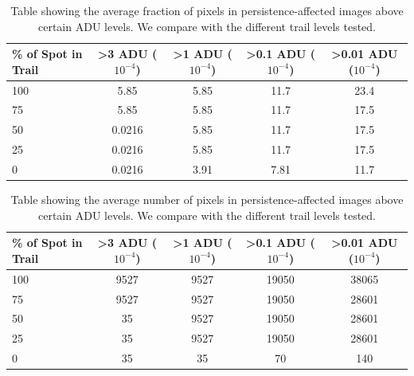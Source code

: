 \documentclass[DM,authoryear,toc]{lsstdoc}
\begin{document}
\begin{table}[h!]
\centering
\begin{tabular}{|lcccc|}
\hline
\% of Spot in Trail & >3 ADU ($10^{-4}$) & >1 ADU ($10^{-4}$) & >0.1 ADU ($10^{-4}$) & >0.01 ADU ($10^{-4}$) \\
\hline
100 & 5.85 & 5.85 & 11.7  & 23.4 \\
75 & 5.85 & 5.85 & 11.7 & 17.5 \\
50 & 0.0216 & 5.85 & 11.7 & 17.5 \\
25 & 0.0216 & 5.85 & 11.7 & 17.5 \\
0 & 0.0216 & 3.91 & 7.81 & 11.7 \\
\hline
\end{tabular}\label{tab:persis_affected}
\caption{Table showing the average fraction of pixels in persistence-affected images above certain ADU levels. 
We compare with the different trail levels tested.
}  
\end{table}

\begin{table}[h!]
  \centering
  \begin{tabular}{|lcccc|}
  \hline
  \% of Spot in Trail & >3 ADU ($10^{-4}$) & >1 ADU ($10^{-4}$) & >0.1 ADU ($10^{-4}$) & >0.01 ADU ($10^{-4}$) \\
  \hline
  100 & 9527 & 9527 & 19050 & 38065 \\
  75 & 9527 & 9527 & 19050 & 28601 \\
  50 & 35 & 9527 & 19050 & 28601 \\
  25 & 35 & 9527 & 19050 & 28601 \\
  0 & 35 & 35 & 70 & 140 \\
  \hline
  \end{tabular}\label{tab:persis_affected_average_number}
  \caption{Table showing the average number of pixels in persistence-affected images above certain ADU levels. 
  We compare with the different trail levels tested.
  }  
  \end{table}
\end{document}
